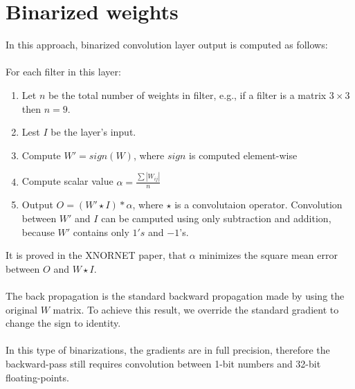 \documentclass[licencjacka]{pracamgr}
\begin{document}
	\section{Binarized weights}
        In this approach, binarized convolution layer output is computed as follows:
        \\\\
        For each filter in this layer:
        \begin{enumerate}
                \item Let $n$ be the total number of weights in filter, e.g., if a filter is a matrix $3 \times 3$ then $n=9$.
                \item Lest $I$ be the layer's input.
                \item Compute $W' = sign(W)$, where $sign$ is computed element-wise
                \item Compute scalar value $\alpha = \frac{\sum{|W_{ij}|}}{n}$
                \item Output $O = (W'\star I) *\alpha$, where $\star$ is a convolutaion operator. Convolution between $W'$ and $I$ can be camputed using only subtraction and addition, because $W'$ contains only $1's$ and $-1$'s.
        \end{enumerate}
        
        It is proved in the XNORNET paper, that $\alpha$ minimizes the square mean error between $O$ and $W\star I$.
        \\\\
        The back propagation is the standard backward propagation made by using the original $W$ matrix. To achieve this result, we override the standard gradient to change the sign to identity.
        \\\\
        In this type of binarizations, the gradients are in full precision, therefore the backward-pass still requires convolution between 1-bit numbers and 32-bit floating-points.
\end{document}
